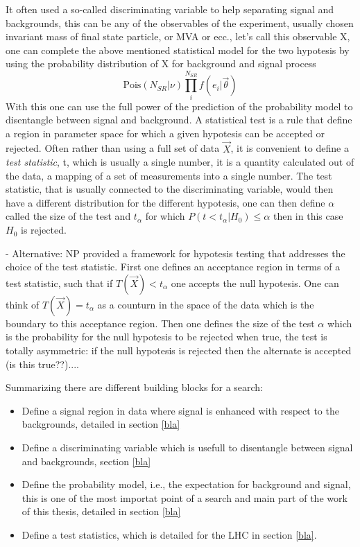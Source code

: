 It often used a so-called discriminating variable to help separating signal and backgrounds, this can be any of the observables of
the experiment, usually chosen invariant mass of final state particle, or MVA or ecc., let's call this observable X, one can complete
the above mentioned statistical model for the two hypotesis by using the probability distribution of X for background and signal process
$$
\text{Pois}(N_{SR}|\nu) \prod_{i}^{N_{SR}} f(e_{i} | \vec{\theta})
$$
With this one can use the full power of the prediction of the probability model to disentangle between signal and background.
A statistical test is a rule that define a region in parameter space for which  a given hypotesis can be accepted or rejected.
Often rather than using a full set of data $\vec{X}$, it is convenient to define a \emph{test statistic}, t, which is usually a single
number, it is a quantity calculated out of the data, a mapping of a set of measurements into a single number. The test statistic, that is usually
connected to the discriminating variable, would then have a different distribution for the different hypotesis, one can then define $\alpha$
called the size of the test and $t_{\alpha}$ for which $P(t < t_{\alpha} | H_{0}) \leq \alpha$ then in this case $H_{0}$ is rejected.

- Alternative: NP provided a framework for hypotesis testing that addresses the choice of the test statistic. First one defines 
an acceptance region in terms of a test statistic, such that if $T(\vec{X}) < t_{\alpha}$ one accepts the null hypotesis. 
One can think of $T(\vec{X}) = t_{\alpha}$ as a counturn in the space of the data which is the boundary to this acceptance region.
Then one defines the size of the test $\alpha$ which is the probability for the null hypotesis to be rejected when true,
the test is totally asymmetric: if the null hypotesis is rejected then the alternate is accepted (is this true??)....

Summarizing there are different building blocks for a search:
\begin{itemize}
	\item Define a signal region in data where signal is enhanced with respect to the backgrounds, detailed in section \ref{bla}
	\item Define a discriminating variable which is usefull to disentangle between signal and backgrounds, section \ref{bla}
	\item Define the probability model, i.e., the expectation for background and signal, this is one of the most importat
		point of a search and main part of the work of this thesis, detailed in section \ref{bla}
	\item Define a test statistics, which is detailed for the LHC in section \ref{bla}.
\end{itemize}


